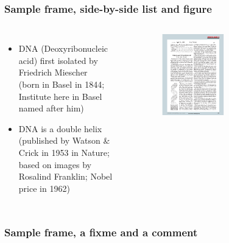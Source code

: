 \begin{frame}\frametitle{Sample frame, side-by-side list and figure}
  \begin{columns}[t]
    \begin{itemize}
      \item DNA (Deoxyribonucleic acid) first isolated by Friedrich Miescher\\ (born in Basel in 1844; Institute here in Basel named after him)
      \item DNA is a double helix\\ (published by Watson \& Crick in 1953 in Nature; based on images by Rosalind Franklin; Nobel price in 1962)
    \end{itemize}
    \begin{figure}[h!]
      \includegraphics[width=0.5\textwidth]{figures/TS-DNA1953.pdf}
    \end{figure}
  \end{columns} 
\end{frame}

\begin{frame}\frametitle{Sample frame, a fixme and a comment}
    
\end{frame}